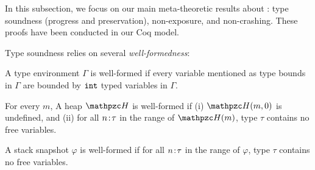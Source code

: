 %     
%  
%  
%  
%  


In this subsection, we focus on our main meta-theoretic results about
\lang: type soundness (progress and preservation),
non-exposure, and non-crashing.
These proofs have been conducted in our Coq model.

Type soundness relies on several \emph{well-formedness}:

\begin{defi}\label{type-wellformed}
A type environment $\Gamma$ is well-formed if every variable mentioned as type bounds in $\Gamma$ are bounded by $\mathtt{int}$ typed variables in $\Gamma$.
\end{defi}

\begin{defi}
For every $m$, A heap $\heap$ is well-formed if (i) $\heap(m,0)$ is undefined, and
(ii) for all ${n}\!:\!{\tau}$ in the range of $\heap(m)$, type $\tau$
contains no free variables. 
\end{defi}

\begin{defi}
A stack snapshot $\varphi$ is well-formed if
for all ${n}\!:\!{\tau}$ in the range of $\varphi$, type $\tau$
contains no free variables. 
\end{defi}

